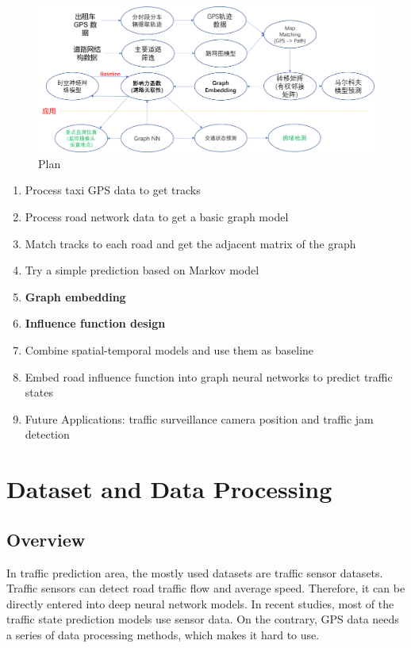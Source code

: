 \documentclass[fontset=none]{ctexart}
\theoremstyle{definition}
\theoremstyle{remark}
\begin{document}
\begin{figure}[htb]
  \centering
  \includegraphics[width=\textwidth]{images/mid/plan.png}
  \caption{Plan}
  \label{fig: plan}
\end{figure}

\begin{enumerate}
  \item Process taxi GPS data to get tracks
  \item Process road network data to get a basic graph model
  \item Match tracks to each road and get the adjacent matrix of the graph
  \item Try a simple prediction based on Markov model
  \item \textbf{Graph embedding}
  \item \textbf{Influence function design}
  \item Combine spatial-temporal models and use them as baseline
  \item Embed road influence function into graph neural networks to predict traffic states
  \item Future Applications: traffic surveillance camera position and traffic jam detection
\end{enumerate}

\clearpage
\section{Dataset and Data Processing}
\subsection{Overview}
In traffic prediction area, the mostly used datasets are traffic sensor datasets.
Traffic sensors can detect road traffic flow and average speed.
Therefore, it can be directly entered into deep neural network models.
In recent studies, most of the traffic state prediction models use sensor data.
On the contrary, GPS data needs a series of data processing methods, which makes it hard to use.
\end{document}
